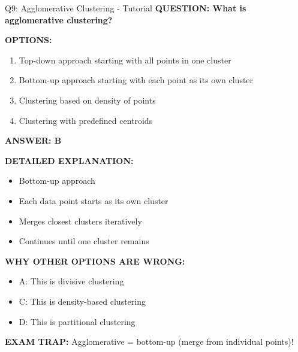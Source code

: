 \documentclass[8pt]{beamer}
\begin{document}
	\begin{frame}{Q9: Agglomerative Clustering - Tutorial}
		\fontsize{6.5}{7.5}\selectfont
		\textbf{QUESTION: What is agglomerative clustering?}
		
		\vspace{0.1cm}
		\textbf{OPTIONS:}
		\begin{enumerate}
			\item Top-down approach starting with all points in one cluster
			\item Bottom-up approach starting with each point as its own cluster
			\item Clustering based on density of points
			\item Clustering with predefined centroids
		\end{enumerate}
		
		\vspace{0.1cm}
		\textcolor{myblue}{\textbf{ANSWER: B}}
		
		\vspace{0.1cm}
		\textbf{DETAILED EXPLANATION:}
		\begin{itemize}
			\item Bottom-up approach
			\item Each data point starts as its own cluster
			\item Merges closest clusters iteratively
			\item Continues until one cluster remains
		\end{itemize}
		
		\vspace{0.1cm}
		\textcolor{myred}{\textbf{WHY OTHER OPTIONS ARE WRONG:}}
		\begin{itemize}
			\item \textcolor{myred}{A:} This is divisive clustering
			\item \textcolor{myred}{C:} This is density-based clustering
			\item \textcolor{myred}{D:} This is partitional clustering
		\end{itemize}
		
		\textcolor{myred}{\textbf{EXAM TRAP:}} Agglomerative = \textcolor{myblue}{bottom-up} (merge from individual points)!
	\end{frame}
	
\end{document}

